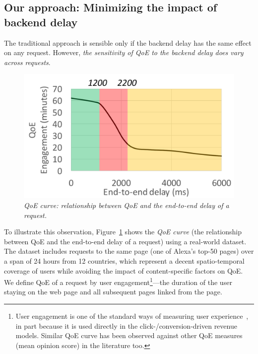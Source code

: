 \subsection{Our approach: Minimizing the impact of backend delay}

The traditional approach is sensible only if the backend delay has the same effect on any request.
However, {\em the sensitivity of QoE to the backend delay does vary across requests}. %

\begin{figure}
	\centering
	\vspace{-0.5cm}
	\includegraphics[width=1.0\textwidth]{figs/qoe-curve.pdf}
	\caption{\em QoE curve: relationship between QoE and the end-to-end delay of a request.}
	\label{fig:qoe-curve}
\end{figure}
To illustrate this observation, Figure~\ref{fig:qoe-curve} shows the {\em QoE curve} (\ie the relationship between QoE and the end-to-end delay of a request) using  a real-world dataset.
The dataset includes requests to the same page (one of Alexa's top-50 pages) over a span of 24 hours from 12 countries, which represent a decent spatio-temporal coverage of users while avoiding the impact of content-specific factors on QoE. 
We define QoE of a request by user engagement\footnote{User engagement is one of the standard ways of measuring user experience~\cite{balachandran2014modeling,shafiq2014understanding,dobrian2011understanding}, in part because it is used directly in the click-/conversion-driven revenue models. Similar QoE curve has been observed against other QoE measures (\eg mean opinion score) in the literature too.}---the duration of the user staying on the web page and all subsequent pages linked from the page. 
